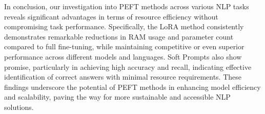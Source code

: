 In conclusion, our investigation into PEFT methods across various NLP tasks reveals significant advantages in terms of resource efficiency without compromising task performance. Specifically, the LoRA method consistently demonstrates remarkable reductions in RAM usage and parameter count compared to full fine-tuning, while maintaining competitive or even superior performance across different models and languages. Soft Prompts also show promise, particularly in achieving high accuracy and recall, indicating effective identification of correct answers with minimal resource requirements. These findings underscore the potential of PEFT methods in enhancing model efficiency and scalability, paving the way for more sustainable and accessible NLP solutions.